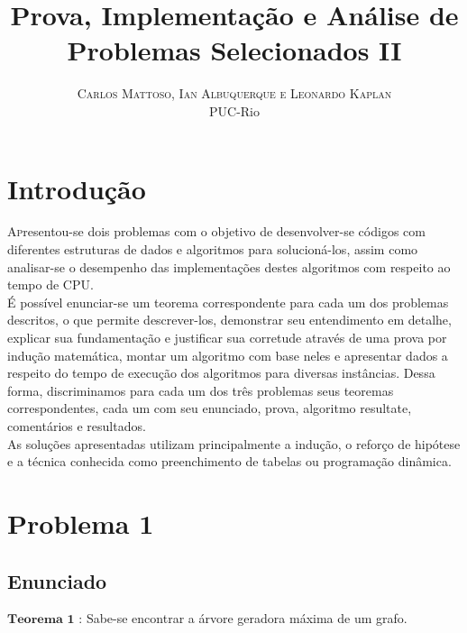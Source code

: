 \documentclass[twoside]{article}
\title{\vspace{-15mm}\fontsize{24pt}{10pt}\selectfont\textbf{Prova, Implementação e Análise de Problemas Selecionados II}} %
\author{
\large
\textsc{Carlos Mattoso, Ian Albuquerque e Leonardo Kaplan}\\[2mm] %
\normalsize PUC-Rio \\ %
}
\date{}
\begin{document}
\maketitle %

\thispagestyle{fancy} %



\begin{multicols}{2} %

\section{Introdução}

\lettrine[nindent=0em,lines=3]{A}presentou-se dois problemas com o objetivo de desenvolver-se códigos com diferentes estruturas de dados e algoritmos para solucioná-los, assim como analisar-se o desempenho das implementações destes algoritmos com respeito ao tempo de CPU.\\

É possível enunciar-se um teorema correspondente para cada um dos problemas descritos, o que permite descrever-los, demonstrar seu entendimento em detalhe, explicar sua fundamentação e justificar sua corretude através de uma prova por indução matemática, montar um algoritmo com base neles e apresentar dados a respeito do tempo de execução dos algoritmos para diversas instâncias. Dessa forma, discriminamos para cada um dos três problemas seus teoremas correspondentes, cada um com seu enunciado, prova,  algoritmo resultate, comentários e resultados.\\

As soluções apresentadas utilizam principalmente a indução, o reforço de hipótese e a técnica conhecida como preenchimento de tabelas ou programação dinâmica.
\newpage
\section{Problema 1}

\subsection{ Enunciado }
\indent  $\mathbf{Teorema}$ $\mathbf{1}$ : Sabe-se encontrar a árvore geradora máxima de um grafo.


\end{multicols}
\end{document}
